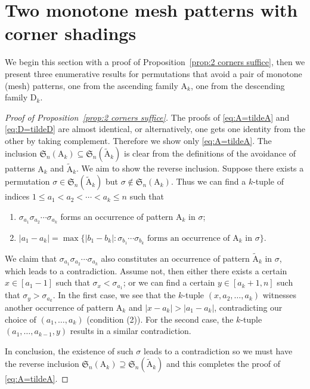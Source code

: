 \documentclass[12pt,reqno]{article}
\numberwithin{equation}{section}
\theoremstyle{plain}
\theoremstyle{definition}
\def\fS{\mathfrak{S}}
\def\rA{\mathrm{A}}
\def\rD{\mathrm{D}}
\begin{document}
\section{Two monotone mesh patterns with corner shadings}\label{sec:monotone}

We begin this section with a proof of Proposition~\ref{prop:2 corners suffice}, then we present three enumerative results for permutations that avoid a pair of monotone (mesh) patterns, one from the ascending family $\rA_k$, one from the descending family $\rD_k$.

\begin{proof}[Proof of Proposition~\ref{prop:2 corners suffice}]
The proofs of \eqref{eq:A=tildeA} and \eqref{eq:D=tildeD} are almost identical, or alternatively, one gets one identity from the other by taking complement. Therefore we show only \eqref{eq:A=tildeA}. The inclusion $\fS_n(\rA_k)\subseteq\fS_n(\widetilde{\rA}_k)$ is clear from the definitions of the avoidance of patterns $\rA_k$ and $\widetilde{\rA}_k$. We aim to show the reverse inclusion. Suppose there exists a permutation $\sigma\in\fS_n(\widetilde{\rA}_k)$ but $\sigma\not\in\fS_n(\rA_k)$. Thus we can find a $k$-tuple of indices $1\le a_1<a_2<\cdots<a_k \le n$ such that
\begin{enumerate}
	\item $\sigma_{a_1}\sigma_{a_2}\cdots\sigma_{a_k}$ forms an occurrence of pattern $\rA_k$ in $\sigma$;
	\item $|a_1-a_k|=\max\{|b_1-b_k|: \sigma_{b_1}\cdots\sigma_{b_k} \text{ forms an occurrence of $\rA_k$ in $\sigma$}\}$.
\end{enumerate}
We claim that $\sigma_{a_1}\sigma_{a_2}\cdots\sigma_{a_k}$ also constitutes an occurrence of pattern $\widetilde{\rA}_k$ in $\sigma$, which leads to a contradiction. Assume not, then either there exists a certain $x\in [a_1-1]$ such that $\sigma_x<\sigma_{a_1}$; or we can find a certain $y\in[a_k+1,n]$ such that $\sigma_y>\sigma_{a_k}$. In the first case, we see that the $k$-tuple $(x,a_2,\ldots,a_k)$ witnesses another occurrence of pattern $\rA_k$ and $|x-a_k|>|a_1-a_k|$, contradicting our choice of $(a_1,\ldots,a_k)$ (condition (2)). For the second case, the $k$-tuple $(a_1,\ldots,a_{k-1},y)$ results in a similar contradiction.

In conclusion, the existence of such $\sigma$ leads to a contradiction so we must have the reverse inclusion $\fS_n(\rA_k)\supseteq\fS_n(\widetilde{\rA}_k)$ and this completes the proof of \eqref{eq:A=tildeA}.
\end{proof}
\end{document}
